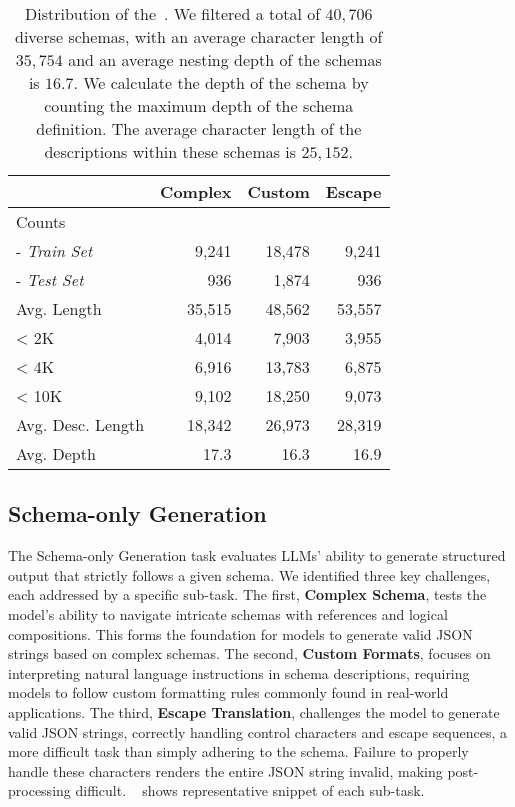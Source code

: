 \begin{wraptable}{l}{0.45\textwidth}
\centering
\small
\begin{tabular}{lrrr}
\toprule
\textbf{} & \textbf{Complex} & \textbf{Custom} & \textbf{Escape} \\ \midrule
Counts & & & \\
 - \textit{Train Set} & 9,241 & 18,478 & 9,241 \\
 - \textit{Test Set} & 936 & 1,874 & 936 \\
\midrule
Avg. Length & 35,515 & 48,562 & 53,557 \\
< 2K & 4,014 & 7,903 & 3,955 \\
< 4K & 6,916 & 13,783 & 6,875 \\
< 10K & 9,102 & 18,250 & 9,073 \\
\midrule
Avg. Desc. Length & 18,342 & 26,973 & 28,319 \\
Avg. Depth & 17.3 & 16.3 & 16.9 \\
\bottomrule
\end{tabular}
\caption{Distribution of the~\ourbench. 
We filtered a total of $40,706$ diverse schemas, with an average character length of $35,754$ and an average nesting depth of the schemas is $16.7$. 
We calculate the depth of the schema by counting the maximum depth of the schema definition.
The average character length of the descriptions within these schemas is $25,152$.
}
\label{fig:stats}
\end{wraptable}

\subsection{Schema-only Generation}
The Schema-only Generation task evaluates LLMs’ ability to generate structured output that strictly follows a given schema. We identified three key challenges, each addressed by a specific sub-task. The first, \textbf{Complex Schema}, tests the model's ability to navigate intricate schemas with references and logical compositions. This forms the foundation for models to generate valid JSON strings based on complex schemas. The second, \textbf{Custom Formats}, focuses on interpreting natural language instructions in schema descriptions, requiring models to follow custom formatting rules commonly found in real-world applications. The third, \textbf{Escape Translation}, challenges the model to generate valid JSON strings, correctly handling control characters and escape sequences, a more difficult task than simply adhering to the schema. Failure to properly handle these characters renders the entire JSON string invalid, making post-processing difficult.
~ shows representative snippet of each sub-task.


